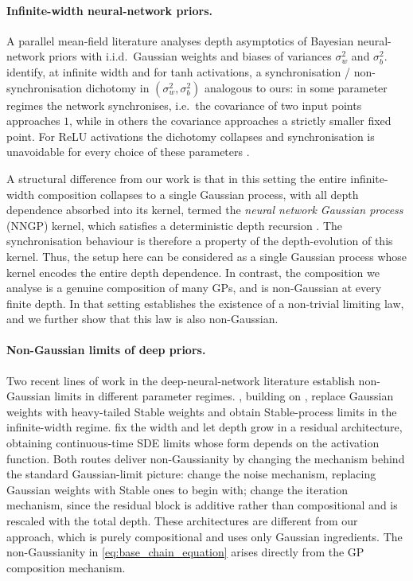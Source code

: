 \documentclass{article}
\begin{document}
\paragraph{Infinite-width neural-network priors.}
A parallel mean-field literature analyses depth asymptotics of Bayesian neural-network priors with i.i.d.\ Gaussian weights and biases of variances $\sigma_w^2$ and $\sigma_b^2$. \citet{poole2016exponential, schoenholz2017deep, hayou2019impact} identify, at infinite width and for tanh activations, a synchronisation / non-synchronisation dichotomy in $(\sigma_w^2, \sigma_b^2)$ analogous to ours: in some parameter regimes the network synchronises, i.e.\ the covariance of two input points approaches $1$, while in others the covariance approaches a strictly smaller fixed point. For ReLU activations the dichotomy collapses and synchronisation is unavoidable for every choice of these parameters \citep{hayou2019impact}.

A structural difference from our work is that in this setting the entire infinite-width composition collapses to a single Gaussian process, with all depth dependence absorbed into its kernel, termed the \emph{neural network Gaussian process} (NNGP) kernel, which satisfies a deterministic depth recursion \citep{matthews2018gaussian, lee2018deep, yang2019scaling}. The synchronisation behaviour is therefore a property of the depth-evolution of this kernel. Thus, the setup here can be considered as a single Gaussian process whose kernel encodes the entire depth dependence. In contrast, the composition we analyse is a genuine composition of many GPs, and is non-Gaussian at every finite depth. In that setting  establishes the existence of a non-trivial limiting law, and we further show that this law is also non-Gaussian.

\paragraph{Non-Gaussian limits of deep priors.}
Two recent lines of work in the deep-neural-network literature establish non-Gaussian limits in different parameter regimes. \citet{bordino2023infinitely}, building on \citet{peluchetti2020stable}, replace Gaussian weights with heavy-tailed Stable weights and obtain Stable-process limits in the infinite-width regime. \citet{hayou2022infinitedepth} fix the width and let depth grow in a residual architecture, obtaining continuous-time SDE limits whose form depends on the activation function. Both routes deliver non-Gaussianity by changing the mechanism behind the standard Gaussian-limit picture: \citet{bordino2023infinitely} change the noise mechanism, replacing Gaussian weights with Stable ones to begin with; \citet{hayou2022infinitedepth} change the iteration mechanism, since the residual block is additive rather than compositional and is rescaled with the total depth. These architectures are different from our approach, which is purely compositional and uses only Gaussian ingredients. The non-Gaussianity in \eqref{eq:base_chain_equation} arises directly from the GP composition mechanism.
\end{document}
